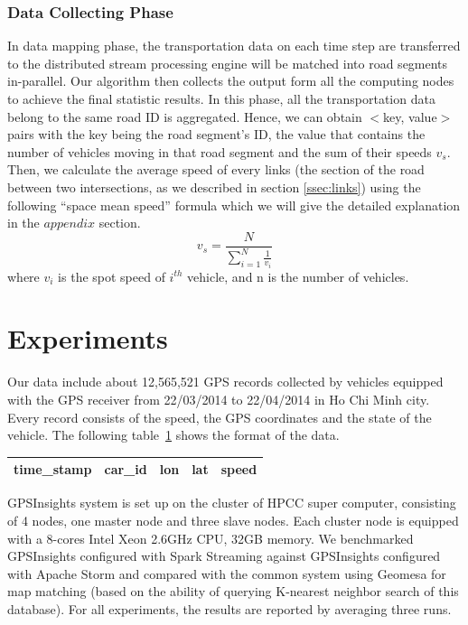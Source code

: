 \documentclass{sig-alternate-05-2015}
\begin{document}
\subsubsection{Data Collecting Phase} \label{datacollectingphase} In data mapping phase, the transportation data on each time step are transferred to the distributed stream processing engine will be matched into road segments in-parallel. Our algorithm then collects the output form all the computing nodes to achieve the final statistic results.  In this phase, all the transportation data belong to the same road ID is aggregated. Hence, we can obtain $<$key, value$>$ pairs with the key being the road segment's ID, the value that contains the number of vehicles moving in that road segment and the sum of their speeds $v_{s}$. Then, we calculate the average speed of every links (the section of the road between two intersections, as we described in section \ref{ssec:links}) using the following ``space mean speed'' formula which we will give the detailed explanation in the $appendix$ section.
\[ v_{s} = \frac{N}{\sum_{i=1}^{N}\frac{1}{v_{i}}}\]
where $v_{i}$ is the spot speed of $i^{th}$ vehicle, and n is the number of vehicles.

\section{Experiments}

Our data include about 12,565,521 GPS records collected by vehicles equipped with the GPS receiver from 22/03/2014 to 22/04/2014 in Ho Chi Minh city. Every record consists of the speed, the GPS coordinates and the state of the vehicle. The following table~\ref{table:location-data} shows the format of the data.

\begin{table}[h]
\centering
\begin{tabular}{|c|c|c|c|c|}
\hline
\textbf{time\_stamp} & \textbf{car\_id} & \textbf{lon}   & \textbf{lat} & \textbf{speed} \\ \hline
\end{tabular}
\label{table:location-data}
\end{table}


GPSInsights system is set up on the cluster of HPCC super computer, consisting of 4 nodes, one master node and three slave nodes. Each cluster node is equipped with a  8-cores Intel Xeon 2.6GHz CPU, 32GB memory. We benchmarked GPSInsights configured with Spark Streaming against GPSInsights configured with Apache Storm and compared with the common system using Geomesa for map matching (based on the ability of querying K-nearest neighbor search of this database). For all experiments, the results are reported by averaging three runs. 
	
\end{document}
